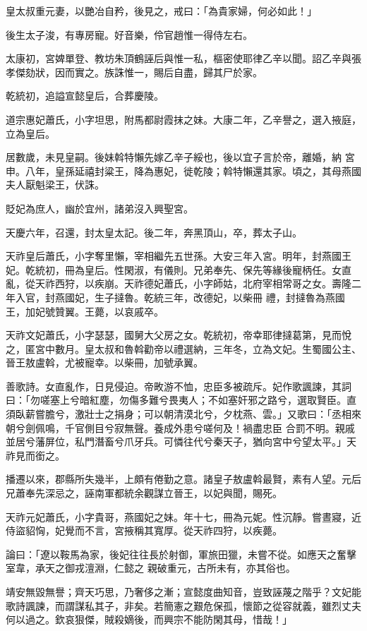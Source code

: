 \begin{pinyinscope}
 皇太叔重元妻，以艷冶自矜，後見之，戒曰：「為貴家婦，何必如此！」



 後生太子浚，有專房寵。好音樂，伶官趙惟一得侍左右。



 太康初，宮婢單登、教坊朱頂鶴誣后與惟一私，樞密使耶律乙辛以聞。詔乙辛與張孝傑劾狀，因而實之。族誅惟一，賜后自盡，歸其尸於家。



 乾統初，追謚宣懿皇后，合葬慶陵。



 道宗惠妃蕭氏，小字坦思，附馬都尉霞抹之妹。大康二年，乙辛譽之，選入掖庭，立為皇后。



 居數歲，未見皇嗣。後妹斡特懶先嫁乙辛子綏也，後以宜子言於帝，離婚，納
 宮申。八年，皇孫延禧封粱王，降為惠妃，徙乾陵；斡特懶還其家。頃之，其母燕國夫人厭魁梁王，伏誅。



 貶妃為庶人，幽於宜州，諸弟沒入興聖宮。



 天慶六年，召還，封太皇太記。後二年，奔黑頂山，卒，葬太子山。



 天祚皇后蕭氏，小字奪里懶，宰相繼先五世孫。大安三年入宮。明年，封燕國王妃。乾統初，冊為皇后。性閑淑，有儀則。兄弟奉先、保先等緣後寵柄任。女直亂，從天祚西狩，以疾崩。天祚德妃蕭氏，小字師姑，北府宰相常哥之女。壽隆二年入官，封燕國妃，生子撻魯。乾統三年，改德妃，以柴冊
 禮，封撻魯為燕國王，加妃號贊翼。王薨，以哀戚卒。



 天祚文妃蕭氏，小字瑟瑟，國舅大父房之女。乾統初，帝幸耶律撻葛第，見而悅之，匿宮中數月。皇太叔和魯斡勸帝以禮選納，三年冬，立為文妃。生蜀國公主、晉王敖盧斡，尤被寵幸。以柴冊，加號承翼。



 善歌詩。女直亂作，日見侵迫。帝畋游不恤，忠臣多被疏斥。妃作歌諷諫，其詞曰：「勿嗟塞上兮暗紅塵，勿傷多難兮畏夷人；不如塞奸邪之路兮，選取賢臣。直須臥薪嘗膽兮，激壯士之捐身；可以朝清漠北兮，夕枕燕、雲。」又歌曰：「丞相來朝兮劍佩鳴，千官側目兮寂無聲。養成外患兮嗟何及！禍盡忠臣
 合罰不明。親戚並居兮藩屏位，私門潛畜兮爪牙兵。可憐往代兮秦天子，猶向宮中兮望太平。」天祚見而銜之。



 播遷以來，郡縣所失幾半，上頗有倦勤之意。諸皇子敖盧斡最賢，素有人望。元后兄蕭奉先深忌之，誣南軍都統余觀謀立晉王，以妃與聞，賜死。



 天祚元妃蕭氏，小字貴哥，燕國妃之妹。年十七，冊為元妮。性沉靜。嘗晝寢，近侍盜貂恟，妃覺而不言，宮掖稱其寬厚。從天祚四狩，以疾薨。



 論曰：「遼以鞍馬為家，後妃往往長於射御，軍旅田獵，未嘗不從。如應天之奮擊室韋，承天之御戎澶淵，仁懿之
 親破重元，古所未有，亦其俗也。



 靖安無毀無譽；齊天巧思，乃奢侈之漸；宣懿度曲知音，豈致誣蔑之階乎？文妃能歌詩諷諫，而謂謀私其子，非矣。若簡憲之艱危保孤，懷節之從容就義，雖烈丈夫何以過之。欽哀狠傑，賊殺嫡後，而興宗不能防閑其母，惜哉！」



\end{pinyinscope}